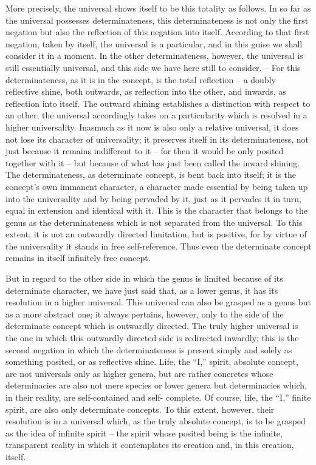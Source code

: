 More precisely, the universal shows itself to be this totality as follows.
In so far as the universal possesses determinateness, this determinateness
is not only the first negation but also the reflection of this negation into
itself. According to that first negation, taken by itself, the universal is a
particular, and in this guise we shall consider it in a moment. In the other
determinateness, however, the universal is still essentially universal, and
this side we have here still to consider. – For this determinateness, as it
is in the concept, is the total reflection – a doubly reflective shine, both
outwards, as reflection into the other, and inwards, as reflection into itself.
The outward shining establishes a distinction with respect to an other; the
universal accordingly takes on a particularity which is resolved in a higher
universality. Inasmuch as it now is also only a relative universal, it does not
lose its character of universality; it preserves itself in its determinateness,
not just because it remains indifferent to it – for then it would be only
posited together with it – but because of what has just been called the inward
shining. The determinateness, as determinate concept, is bent back into itself;
it is the concept’s own immanent character, a character made essential by
being taken up into the universality and by being pervaded by it, just as
it pervades it in turn, equal in extension and identical with it. This is
the character that belongs to the genus as the determinateness which is
not separated from the universal. To this extent, it is not an outwardly
directed limitation, but is positive, for by virtue of the universality it stands
in free self-reference. Thus even the determinate concept remains in itself
infinitely free concept.

But in regard to the other side in which the genus is limited because of
its determinate character, we have just said that, as a lower genus, it has
its resolution in a higher universal. This universal can also be grasped as
a genus but as a more abstract one; it always pertains, however, only to
the side of the determinate concept which is outwardly directed. The truly
higher universal is the one in which this outwardly directed side is redirected
inwardly; this is the second negation in which the determinateness is present
simply and solely as something posited, or as reflective shine. Life, the “I,”
spirit, absolute concept, are not universals only as higher genera, but are
rather concretes whose determinacies are also not mere species or lower
genera but determinacies which, in their reality, are self-contained and self-
complete. Of course, life, the “I,” finite spirit, are also only determinate
concepts. To this extent, however, their resolution is in a universal which,
as the truly absolute concept, is to be grasped as the idea of infinite spirit –
the spirit whose posited being is the infinite, transparent reality in which it
contemplates its creation and, in this creation, itself.

